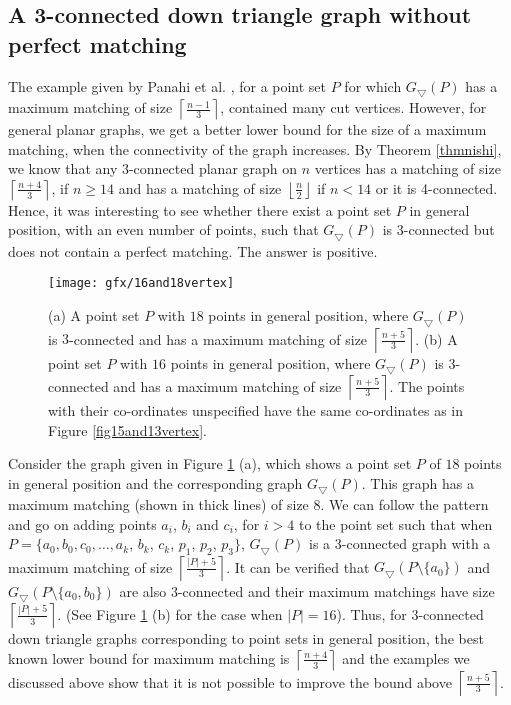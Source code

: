 \subsection{A 3-connected down triangle graph without perfect matching}
The example given by Panahi et al. \cite{Panahi}, for a point set $P$ for which $G_\bigtriangledown(P)$ has a maximum matching of size 
$\left\lceil\frac{n-1}{3}\right\rceil$, contained many cut vertices. However, for general planar graphs, we get a better lower bound for 
the size of a maximum matching, when the connectivity of the graph increases. By Theorem \ref{thmnishi}, we know that any $3$-connected 
planar graph on $n$ vertices has a matching of size $\left\lceil\frac{n+4}{3}\right\rceil$, if $n \ge 14$ and has a matching of 
size $\left\lfloor\frac{n}{2}\right\rfloor$ if $n<14$ or it is 4-connected. Hence, it was interesting to see whether there exist a 
point set $P$ in general position, with an even number of points, such that $G_\bigtriangledown(P)$ is $3$-connected but does not contain 
a perfect matching. The answer is positive. 
\begin{figure}
  \centering
  \texttt{[image: gfx/16and18vertex]}   %
  \caption[Example of 3-connected graph]{(a) A point set $P$ with $18$ points in general position, where $G_\bigtriangledown(P)$ is $3$-connected and has a maximum matching 
of size $\left\lceil\frac{n+5}{3}\right\rceil$. (b) A point set $P$ with $16$ points in general position, where $G_\bigtriangledown(P)$ is $3$-connected 
and has a maximum matching of size $\left\lceil\frac{n+5}{3}\right\rceil$. The points with their co-ordinates unspecified have the same co-ordinates as 
in Figure \ref{fig15and13vertex}.}
\label{fig16and18vertex}
  \end{figure}  
Consider the graph given in Figure \ref{fig16and18vertex} (a), which shows a point set $P$ of $18$ points in general position and the corresponding 
graph $G_\bigtriangledown(P)$. This graph has a maximum matching (shown in thick lines) of size $8$. We can follow the pattern and go on adding 
points $a_i$, $b_i$ and $c_i$, for $i >4$ to the point set such that when $P= \{a_0, b_0, c_0, \ldots, a_k$, $b_k$, $c_k$, $p_1$, $p_2$, $p_3\}$, 
$G_\bigtriangledown(P)$ is a $3$-connected graph with a maximum matching of size $\left \lceil\frac{|P|+5}{3} \right\rceil$. It can be verified 
that $G_\bigtriangledown(P\setminus \{a_0\})$ and $G_\bigtriangledown(P\setminus \{a_0, b_0\})$ are also $3$-connected and their maximum matchings 
have size $\left\lceil\frac{|P|+5}{3}\right\rceil$. (See Figure \ref{fig16and18vertex} (b) for the case when $|P|=16$). Thus, for $3$-connected down 
triangle graphs corresponding to point sets in general position, the best known lower bound for maximum matching is $\left\lceil\frac{n+4}{3}\right\rceil$ 
and the examples we discussed above show that it is not possible to improve the bound above $\left\lceil\frac{n+5}{3}\right\rceil$. 
